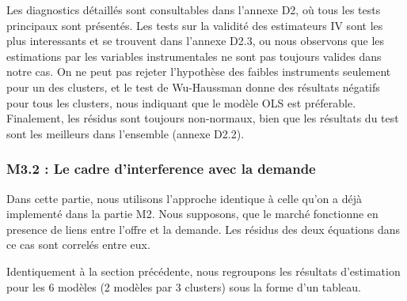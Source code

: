 \documentclass[11pt,]{article}
\begin{document}
Les diagnostics détaillés sont consultables dans l'annexe D2, où tous
les tests principaux sont présentés. Les tests sur la validité des
estimateurs IV sont les plus interessants et se trouvent dans l'annexe
D2.3, ou nous observons que les estimations par les variables
instrumentales ne sont pas toujours valides dans notre cas. On ne peut
pas rejeter l'hypothèse des faibles instruments seulement pour un des
clusters, et le test de Wu-Haussman donne des résultats négatifs pour
tous les clusters, nous indiquant que le modèle OLS est préferable.
Finalement, les résidus sont toujours non-normaux, bien que les
résultats du test sont les meilleurs dans l'ensemble (annexe D2.2).

\hypertarget{m3.2-le-cadre-dinterference-avec-la-demande}{%
\subsubsection{M3.2 : Le cadre d'interference avec la
demande}\label{m3.2-le-cadre-dinterference-avec-la-demande}}

Dans cette partie, nous utilisons l'approche identique à celle qu'on a
déjà implementé dans la partie M2. Nous supposons, que le marché
fonctionne en presence de liens entre l'offre et la demande. Les résidus
des deux équations dans ce cas sont correlés entre eux.

Identiquement à la section précédente, nous regroupons les résultats
d'estimation pour les 6 modèles (2 modèles par 3 clusters) sous la forme
d'un tableau.

\FloatBarrier
\end{document}
